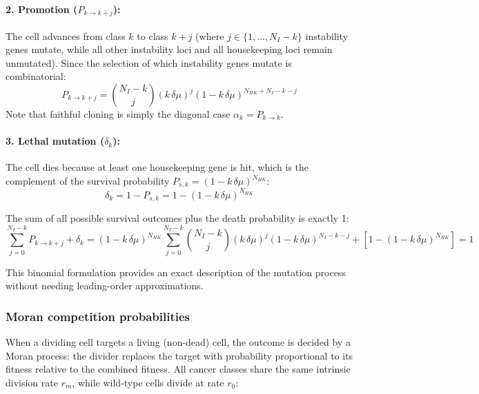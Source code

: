 \documentclass[11pt,a4paper]{article}
\begin{document}
\paragraph{2. Promotion ($P_{k \to k+j}$):} The cell advances from class $k$ to class $k+j$ (where $j \in \{1, \dots, N_I - k\}$ instability genes mutate, while all other instability loci and all housekeeping loci remain unmutated). Since the selection of which instability genes mutate is combinatorial:
\begin{equation}
    P_{k \to k+j} = \binom{N_I - k}{j} (k\,\delta\mu)^j (1 - k\,\delta\mu)^{N_{HK} + N_I - k - j}
\end{equation}
Note that faithful cloning is simply the diagonal case $\alpha_k = P_{k \to k}$.

\paragraph{3. Lethal mutation ($\delta_k$):} The cell dies because at least one housekeeping gene is hit, which is the complement of the survival probability $P_{s,k} = (1 - k\,\delta\mu)^{N_{HK}}$:
\begin{equation}
    \delta_k = 1 - P_{s,k} = 1 - (1 - k\,\delta\mu)^{N_{HK}}
\end{equation}

The sum of all possible survival outcomes plus the death probability is exactly 1:
\begin{equation}
    \sum_{j=0}^{N_I - k} P_{k \to k+j} + \delta_k = (1 - k\,\delta\mu)^{N_{HK}} \sum_{j=0}^{N_I - k} \binom{N_I - k}{j} (k\,\delta\mu)^j (1 - k\,\delta\mu)^{N_I - k - j} + [1 - (1 - k\,\delta\mu)^{N_{HK}}] = 1
\end{equation}

This binomial formulation provides an exact description of the mutation process without needing leading-order approximations.

\subsubsection*{Moran competition probabilities}

When a dividing cell targets a living (non-dead) cell, the outcome is decided by a Moran process: the divider replaces the target with probability proportional to its fitness relative to the combined fitness. All cancer classes share the same intrinsic division rate $r_m$, while wild-type cells divide at rate $r_0$:
\end{document}
